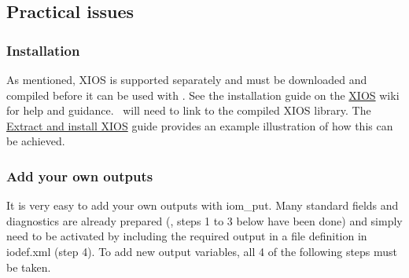 \documentclass[../main/NEMO_manual]{subfiles}
\begin{document}
\subsection{Practical issues}

\subsubsection{Installation}

As mentioned, XIOS is supported separately and must be downloaded and compiled before it can be used with \NEMO.
See the installation guide on the \href{http://forge.ipsl.jussieu.fr/ioserver/wiki}{XIOS} wiki for help and guidance.
\NEMO\ will need to link to the compiled XIOS library.
The \href{https://forge.ipsl.jussieu.fr/nemo/chrome/site/doc/NEMO/guide/html/install.html#extract-and-install-xios}
{Extract and install XIOS} guide provides an example illustration of how this can be achieved.

\subsubsection{Add your own outputs}

It is very easy to add your own outputs with iom\_put.
Many standard fields and diagnostics are already prepared (\ie, steps 1 to 3 below have been done) and
simply need to be activated by including the required output in a file definition in iodef.xml (step 4).
To add new output variables, all 4 of the following steps must be taken.
\end{document}
